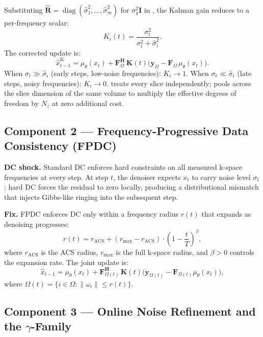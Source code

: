 \documentclass[conference]{IEEEtran}
\newcommand{\hatR}{\hat{\mathbf{R}}}
\newcommand{\hatsig}{\hat{\sigma}}
\newcommand{\muth}{\mu_\theta}
\begin{document}
Substituting $\hatR=\operatorname{diag}(\hatsig_1^2,\ldots,\hatsig_m^2)$
for $\sigma_y^2\mathbf{I}$ in , the Kalman gain reduces to
a per-frequency scalar:
\begin{equation}
  K_i(t) = \frac{\sigma_t^2}{\sigma_t^2 + \hatsig_i^2}.
  \label{eq:gain}
\end{equation}
The corrected update is:
\begin{equation}
  \hat{x}_{t-1}^{\text{K}} = \muth(x_t)
  + \mathbf{F}_\Omega^\mathbf{H}\, \mathbf{K}(t)
  \bigl(\mathbf{y}_\Omega - \mathbf{F}_\Omega\,\muth(x_t)\bigr).
  \label{eq:kalman_update}
\end{equation}
When $\sigma_t \gg \hatsig_i$ (early steps, low-noise frequencies): $K_i
\rightarrow 1$. When $\sigma_t \ll \hatsig_i$ (late steps, noisy
frequencies): $K_i \rightarrow 0$.  treats every slice
independently;  pools across the slice dimension of the
same volume to multiply the effective degrees of freedom by $N_z$ at zero
additional cost.

\subsection{Component 2 — Frequency-Progressive Data Consistency (FPDC)}

\textbf{DC shock.} Standard DC enforces hard constraints on all measured
k-space frequencies at every step. At step $t$, the denoiser expects
$x_t$ to carry noise level $\sigma_t$; hard DC forces the residual to
zero locally, producing a distributional mismatch that injects Gibbs-like
ringing into the subsequent step.

\textbf{Fix.} FPDC enforces DC only within a frequency radius $r(t)$ that
expands as denoising progresses:
\begin{equation}
  r(t) = r_{\text{ACS}} + (r_{\max} - r_{\text{ACS}})
  \cdot \left(1 - \frac{t}{T}\right)^\beta,
  \label{eq:fpdc}
\end{equation}
where $r_{\text{ACS}}$ is the ACS radius, $r_{\max}$ is the full k-space
radius, and $\beta > 0$ controls the expansion rate. The joint update is:
\begin{equation}
  \hat{x}_{t-1} = \muth(x_t) + \mathbf{F}_{\Omega(t)}^\mathbf{H}\,
  \mathbf{K}(t)\bigl(\mathbf{y}_{\Omega(t)} -
  \mathbf{F}_{\Omega(t)}\muth(x_t)\bigr),
  \label{eq:combined}
\end{equation}
where $\Omega(t) = \{i \in \Omega : \|\omega_i\| \leq r(t)\}$.

\subsection{Component 3 — Online Noise Refinement and the $\gamma$-Family}
\end{document}
